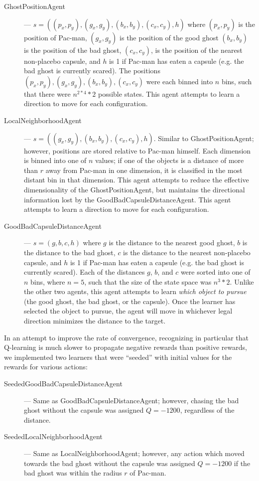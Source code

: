 \documentclass[11pt]{amsart}
\begin{document}
\begin{description}
	\item[GhostPositionAgent] --- $s = ((p_x, p_y), (g_x, g_y), (b_x, b_y), (c_x, c_y), h)$ where $(p_x, p_y)$ is the position of Pac-man, $(g_x, g_y)$ is the position of the good ghost $(b_x, b_y)$ is the position of the bad ghost, $(c_x, c_y)$, is the position of the nearest non-placebo capsule, and $h$ is 1 if Pac-man has eaten a capsule (e.g. the bad ghost is currently scared). The positions $(p_x, p_y), (g_x, g_y), (b_x, b_y), (c_x, c_y)$ were each binned into $n$ bins, such that there were $n^{2 * 4} * 2$ possible states. This agent attempts to learn a direction to move for each configuration.
	\item[LocalNeighborhoodAgent] --- $s = ((g_x, g_y), (b_x, b_y), (c_x, c_y), h)$. Similar to GhostPositionAgent; however, positions are stored relative to Pac-man himself. Each dimension is binned into one of $n$ values; if one of the objects is a distance of more than $r$ away from Pac-man in one dimension, it is classified in the most distant bin in that dimension. This agent attempts to reduce the effective dimensionality of the GhostPositionAgent, but maintains the directional information lost by the GoodBadCapsuleDistanceAgent. This agent attempts to learn a direction to move for each configuration.
	\item[GoodBadCapsuleDistanceAgent] --- $s = (g, b, c, h)$ where $g$ is the distance to the nearest good ghost, $b$ is the distance to the bad ghost, $c$ is the distance to the nearest non-placebo capsule, and $h$ is 1 if Pac-man has eaten a capsule (e.g. the bad ghost is currently scared). Each of the distances $g$, $b$, and $c$ were sorted into one of $n$ bins, where $n = 5$, such that the size of the state space was $n^3 * 2$. Unlike the other two agents, this agent attempts to learn \emph{which object to pursue} (the good ghost, the bad ghost, or the capsule). Once the learner has selected the object to pursue, the agent will move in whichever legal direction minimizes the distance to the target.  
\end{description}

In an attempt to improve the rate of convergence, recognizing in particular that Q-learning is much slower to propagate negative rewards than positive rewards, we implemented two learners that were ``seeded'' with initial values for the rewards for various actions:

\begin{description}
	\item[SeededGoodBadCapsuleDistanceAgent] --- Same as GoodBadCapsuleDistanceAgent; however, chasing the bad ghost without the capsule was assigned $Q = -1200$, regardless of the distance.
	\item[SeededLocalNeighborhoodAgent] --- Same as LocalNeighborhoodAgent; however, any action which moved towards the bad ghost without the capsule was assigned $Q = -1200$ if the bad ghost was within the radius $r$ of Pac-man.
\end{description}
\end{document}
